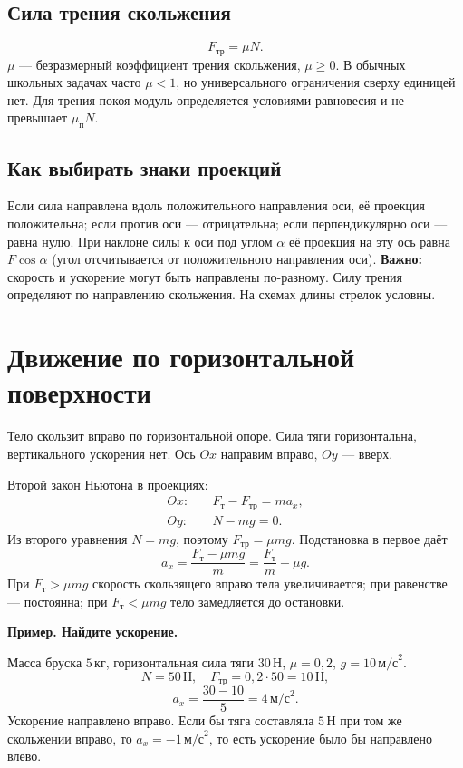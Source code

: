 \documentclass[a4paper,12pt]{article}
\newcommand{\unit}[1]{\,\text{#1}}
\newcommand{\fr}{F_{\text{тр}}}
\newcommand{\Ft}{F_{\text{т}}}
\newcommand{\example}[1]{\par\medskip\textcolor{darkaccent}{\textbf{#1}}\par}
\begin{document}
\subsection{Сила трения скольжения}
\[\fr=\mu N.\]
$\mu$ --- безразмерный коэффициент трения скольжения, $\mu\geq0$. В обычных школьных задачах часто $\mu<1$, но универсального ограничения сверху единицей нет. Для трения покоя модуль определяется условиями равновесия и не превышает $\mu_{\text{п}}N$.
\subsection{Как выбирать знаки проекций}
Если сила направлена вдоль положительного направления оси, её проекция положительна; если против оси --- отрицательна; если перпендикулярно оси --- равна нулю. При наклоне силы к оси под углом $\alpha$ её проекция на эту ось равна $F\cos\alpha$ (угол отсчитывается от положительного направления оси).
\textbf{Важно:} скорость и ускорение могут быть направлены по-разному. Силу трения определяют по направлению скольжения. На схемах длины стрелок условны.
\clearpage
\section{Движение по горизонтальной поверхности}
Тело скользит вправо по горизонтальной опоре. Сила тяги горизонтальна, вертикального ускорения нет. Ось $Ox$ направим вправо, $Oy$ --- вверх.
\begin{center}
\end{center}
Второй закон Ньютона в проекциях:
\[\begin{aligned} Ox:\quad &\Ft-\fr=ma_x,\\ Oy:\quad &N-mg=0.\end{aligned}\]
Из второго уравнения $N=mg$, поэтому $\fr=\mu mg$. Подстановка в первое даёт
\[\boxed{a_x=\frac{\Ft-\mu mg}{m}=\frac{\Ft}{m}-\mu g.}\]
При $\Ft>\mu mg$ скорость скользящего вправо тела увеличивается; при равенстве --- постоянна; при $\Ft<\mu mg$ тело замедляется до остановки.
\example{Пример. Найдите ускорение.}
Масса бруска $5\unit{кг}$, горизонтальная сила тяги $30\unit{Н}$, $\mu=0,2$, $g=10\unit{м/с}^2$.
\[N=50\unit{Н},\quad \fr=0,2\cdot50=10\unit{Н},\]
\[a_x=\frac{30-10}{5}=4\unit{м/с}^2.\]
Ускорение направлено вправо. Если бы тяга составляла $5\unit{Н}$ при том же скольжении вправо, то $a_x=-1\unit{м/с}^2$, то есть ускорение было бы направлено влево.
\clearpage
\end{document}

